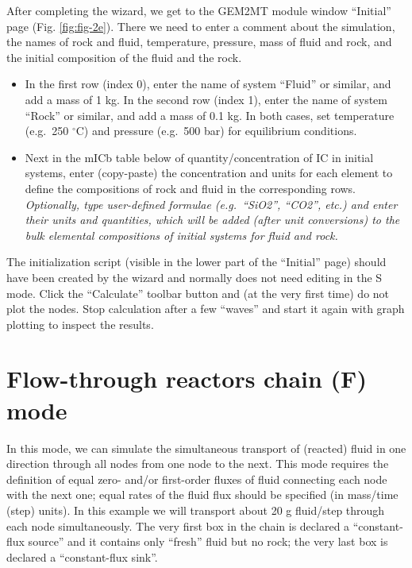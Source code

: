 \documentclass[
]{book}
\begin{document}
After completing the wizard, we get to the GEM2MT module window ``Initial'' page (Fig. \ref{fig:fig-2e}). There we need to enter a comment about the simulation, the names of rock and fluid, temperature, pressure, mass of fluid and rock, and the initial composition of the fluid and the rock.

\begin{itemize}
\item
  In the first row (index 0), enter the name of system ``Fluid'' or similar, and add a mass of 1 kg. In the second row (index 1), enter the name of system ``Rock'' or similar, and add a mass of 0.1 kg. In both cases, set temperature (e.g.~250 \(^{\circ}\)C) and pressure (e.g.~500 bar) for equilibrium conditions.
\item
  Next in the mICb table below of quantity/concentration of IC in initial systems, enter (copy-paste) the concentration and units for each element to define the compositions of rock and fluid in the corresponding rows. \emph{Optionally, type user-defined formulae (e.g.~``SiO2'', ``CO2'', etc.) and enter their units and quantities, which will be added (after unit conversions) to the bulk elemental compositions of initial systems for fluid and rock.}
\end{itemize}

The initialization script (visible in the lower part of the ``Initial'' page) should have been created by the wizard and normally does not need editing in the S mode. Click the ``Calculate'' toolbar button and (at the very first time) do not plot the nodes. Stop calculation after a few ``waves'' and start it again with graph plotting to inspect the results.

\hypertarget{flow-through-reactors-chain-f-mode}{%
\section{Flow-through reactors chain (F) mode}\label{flow-through-reactors-chain-f-mode}}

In this mode, we can simulate the simultaneous transport of (reacted) fluid in one direction through all nodes from one node to the next. This mode requires the definition of equal zero- and/or first-order fluxes of fluid connecting each node with the next one; equal rates of the fluid flux should be specified (in mass/time (step) units). In this example we will transport about 20 g fluid/step through each node simultaneously. The very first box in the chain is declared a ``constant-flux source'' and it contains only ``fresh'' fluid but no rock; the very last box is declared a ``constant-flux sink''.
\end{document}
